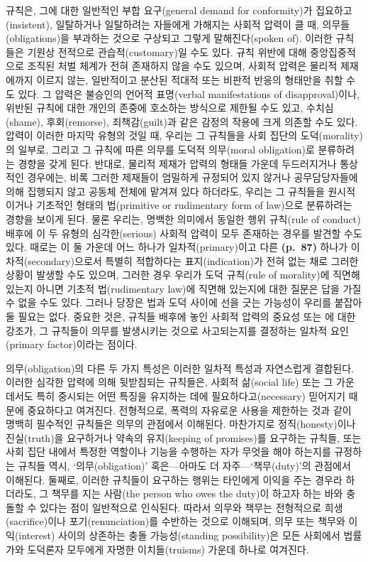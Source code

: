 규칙은, 그에 대한 일반적인 부합 요구(general demand for conformity)가
집요하고(insistent), 일탈하거나 일탈하려는 자들에게 가해지는 사회적
압력이 클 때, 의무들(obligations)을 부과하는 것으로 구상되고 그렇게
말해진다(spoken of). 이러한 규칙들은 기원상 전적으로 관습적(customary)일
수도 있다. 규칙 위반에 대해 중앙집중적으로 조직된 처벌 체계가 전혀
존재하지 않을 수도 있으며, 사회적 압력은 물리적 제재에까지 이르지 않는,
일반적이고 분산된 적대적 또는 비판적 반응의 형태만을 취할 수도 있다. 그
압력은 불승인의 언어적 표명(verbal manifestations of disapproval)이나,
위반된 규칙에 대한 개인의 존중에 호소하는 방식으로 제한될 수도 있고,
수치심(shame), 후회(remorse), 죄책감(guilt)과 같은 감정의 작용에 크게
의존할 수도 있다. 압력이 이러한 마지막 유형의 것일 때, 우리는 그
규칙들을 사회 집단의 도덕(morality)의 일부로, 그리고 그 규칙에 따른
의무를 도덕적 의무(moral obligation)로 분류하려는 경향을 갖게 된다.
반대로, 물리적 제재가 압력의 형태들 가운데 두드러지거나 통상적인
경우에는, 비록 그러한 제재들이 엄밀하게 규정되어 있지 않거나
공무담당자들에 의해 집행되지 않고 공동체 전체에 맡겨져 있다 하더라도,
우리는 그 규칙들을 원시적이거나 기초적인 형태의 법(primitive or
rudimentary form of law)으로 분류하려는 경향을 보이게 된다. 물론 우리는,
명백한 의미에서 동일한 행위 규칙(rule of conduct) 배후에 이 두 유형의
심각한(serious) 사회적 압력이 모두 존재하는 경우를 발견할 수도 있다.
때로는 이 둘 가운데 어느 하나가 일차적(primary)이고 다른
\textbf{(p.~87)} 하나가 이차적(secondary)으로서 특별히 적합하다는
표지(indication)가 전혀 없는 채로 그러한 상황이 발생할 수도 있으며,
그러한 경우 우리가 도덕 규칙(rule of morality)에 직면해 있는지 아니면
기초적 법(rudimentary law)에 직면해 있는지에 대한 질문은 답을 가질 수
없을 수도 있다. 그러나 당장은 법과 도덕 사이에 선을 긋는 가능성이 우리를
붙잡아 둘 필요는 없다. 중요한 것은, 규칙들 배후에 놓인 사회적 압력의
중요성 또는 에 대한 강조가, 그 규칙들이 의무를
발생시키는 것으로 사고되는지를 결정하는 일차적 요인(primary
factor)이라는 점이다.

의무(obligation)의 다른 두 가지 특성은 이러한 일차적 특성과 자연스럽게
결합된다. 이러한 심각한 압력에 의해 뒷받침되는 규칙들은, 사회적
삶(social life) 또는 그 가운데서도 특히 중시되는 어떤 특징을 유지하는
데에 필요하다고(necessary) 믿어지기 때문에 중요하다고 여겨진다.
전형적으로, 폭력의 자유로운 사용을 제한하는 것과 같이 명백히 필수적인
규칙들은 의무의 관점에서 이해된다. 마찬가지로 정직(honesty)이나
진실(truth)을 요구하거나 약속의 유지(keeping of promises)를 요구하는
규칙들, 또는 사회 집단 내에서 특정한 역할이나 기능을 수행하는 자가
무엇을 해야 하는지를 규정하는 규칙들 역시, ‘의무(obligation)’
혹은---아마도 더 자주---‘책무(duty)’의 관점에서 이해된다. 둘째로, 이러한
규칙들이 요구하는 행위는 타인에게 이익을 주는 경우라 하더라도, 그 책무를
지는 사람(the person who owes the duty)이 하고자 하는 바와 충돌할 수
있다는 점이 일반적으로 인식된다. 따라서 의무와 책무는 전형적으로
희생(sacrifice)이나 포기(renunciation)를 수반하는 것으로 이해되며, 의무
또는 책무와 이익(interest) 사이의 상존하는 충돌 가능성(standing
possibility)은 모든 사회에서 법률가와 도덕론자 모두에게 자명한
이치들(truisms) 가운데 하나로 여겨진다.

